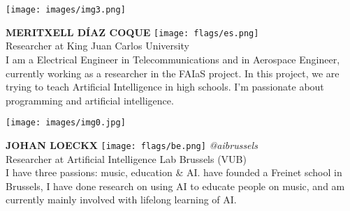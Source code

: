 \noindent
\begin{minipage}{0.3\textwidth}
\centering
\texttt{[image: images/img3.png]}
\end{minipage}
\hfill
\begin{minipage}{0.6\textwidth}\raggedright
\color{color1}\uppercase{\textbf{Meritxell Díaz Coque}}
\color{color2}\hspace{0.2cm}\texttt{[image: flags/es.png]}
\\
Researcher at King Juan Carlos University\\
{\footnotesize I am a Electrical Engineer in Telecommunications and in Aerospace Engineer, currently working as a researcher in the FAIaS project. In this project, we are trying to teach Artificial Intelligence in high schools. I'm passionate about programming and artificial intelligence.}\\
\end{minipage}
\newline\newline\newline

\noindent
\begin{minipage}{0.3\textwidth}
\centering
\texttt{[image: images/img0.jpg]}
\end{minipage}
\hfill
\begin{minipage}{0.6\textwidth}\raggedright
\color{color1}\uppercase{\textbf{Johan Loeckx}}
\color{color2}\hspace{0.2cm}\texttt{[image: flags/be.png]}
\hspace{0.2cm}\textit{@aibrussels}
\\
Researcher at Artificial Intelligence Lab Brussels (VUB)\\
{\footnotesize I have three passions: music, education \& AI.  have founded a Freinet school in Brussels, I have done research on using AI to educate people on music, and am currently mainly involved with lifelong learning of AI.}\\
\end{minipage}
\newline\newline\newline

